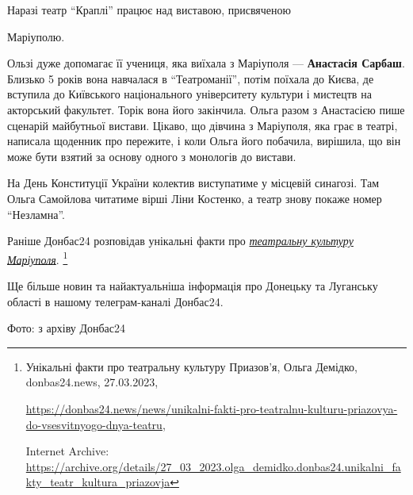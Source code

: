Наразі театр \enquote{Краплі} працює над виставою, присвяченою\par\noindent Маріуполю.

Ользі дуже допомагає її учениця, яка виїхала з Маріуполя — \textbf{Анастасія Сарбаш}.
Близько 5 років вона навчалася в \enquote{Театроманії}, потім поїхала до Києва, де
вступила до Київського національного університету культури і мистецтв на
акторський факультет. Торік вона його закінчила. Ольга разом з Анастасією пише
сценарій майбутньої вистави. Цікаво, що дівчина з Маріуполя, яка грає в театрі,
написала щоденник про пережите, і коли Ольга його побачила, вирішила, що він
може бути взятий за основу одного з монологів до вистави.

На День Конституції України колектив виступатиме у місцевій синагозі. Там Ольга
Самойлова читатиме вірші Ліни Костенко, а театр знову покаже номер \enquote{Незламна}.

Раніше Донбас24 розповідав унікальні факти про \href{https://archive.org/details/27_03_2023.olga_demidko.donbas24.unikalni_fakty_teatr_kultura_priazovja}{\emph{театральну культуру Маріуполя}}.%
\footnote{Унікальні факти про театральну культуру Приазов'я, Ольга Демідко, donbas24.news, 27.03.2023, \par%
\url{https://donbas24.news/news/unikalni-fakti-pro-teatralnu-kulturu-priazovya-do-vsesvitnyogo-dnya-teatru}, \par%
Internet Archive: \url{https://archive.org/details/27_03_2023.olga_demidko.donbas24.unikalni_fakty_teatr_kultura_priazovja}}

Ще більше новин та найактуальніша інформація про Донецьку та Луганську області
в нашому телеграм-каналі Донбас24.

Фото: з архіву Донбас24


